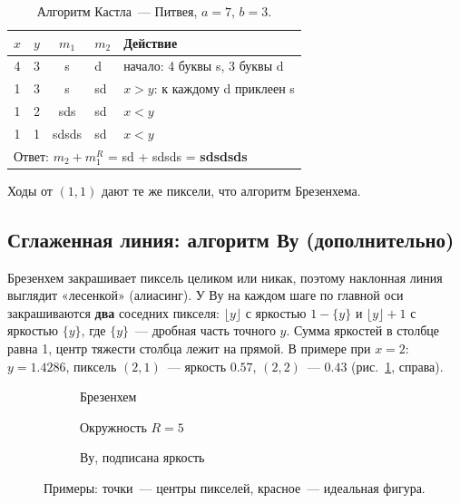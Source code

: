 \documentclass[11pt,a4paper]{article}
\begin{document}
\begin{table}[H]
\centering\small
\caption{Алгоритм Кастла~— Питвея, $a = 7$, $b = 3$.}
\begin{tabular}{cccll}
\toprule
$x$ & $y$ & $m_1$ & $m_2$ & Действие \\
\midrule
4 & 3 & s & d & начало: 4 буквы s, 3 буквы d \\
1 & 3 & s & sd & $x > y$: к каждому d приклеен s \\
1 & 2 & sds & sd & $x < y$ \\
1 & 1 & sdsds & sd & $x < y$ \\
\midrule
\multicolumn{5}{l}{Ответ: $m_2 + m_1^R$ = sd + sdsds = \textbf{sdsdsds}} \\
\bottomrule
\end{tabular}
\end{table}
Ходы от $(1,1)$ дают те же пиксели, что алгоритм Брезенхема.

\subsection{Сглаженная линия: алгоритм Ву (дополнительно)}
Брезенхем закрашивает пиксель целиком или никак, поэтому наклонная линия выглядит
«лесенкой» (алиасинг). У Ву на каждом шаге по главной оси закрашиваются \textbf{два}
соседних пикселя: $\lfloor y \rfloor$ с яркостью $1 - \{y\}$ и $\lfloor y \rfloor + 1$ с
яркостью $\{y\}$, где $\{y\}$~— дробная часть точного $y$. Сумма яркостей в столбце
равна 1, центр тяжести столбца лежит на прямой. В примере при $x = 2$: $y = 1.4286$, пиксель $(2,1)$~— яркость $0.57$,
$(2,2)$~— $0.43$ (рис.~\ref{fig:examples}, справа).

\begin{figure}[H]
\centering
\begin{subfigure}[b]{0.31\linewidth}\centering\resizebox{\linewidth}{!}{}\caption{Брезенхем}\end{subfigure}\hfill
\begin{subfigure}[b]{0.31\linewidth}\centering\resizebox{0.85\linewidth}{!}{}\caption{Окружность $R = 5$}\end{subfigure}\hfill
\begin{subfigure}[b]{0.31\linewidth}\centering\resizebox{\linewidth}{!}{}\caption{Ву, подписана яркость}\end{subfigure}
\caption{Примеры: точки~— центры пикселей, красное~— идеальная фигура.}
\label{fig:examples}
\end{figure}
\end{document}
